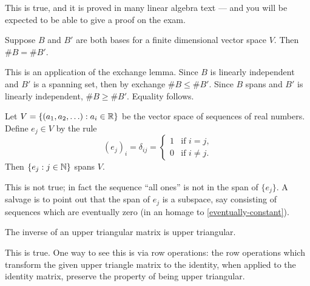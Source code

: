 \documentclass{homework}
\begin{document}
\begin{solution}
  This is true, and it is proved in many linear algebra text --- and
  you will be expected to be able to give a proof on the exam.
\end{solution}

\begin{problem}
  Suppose $B$ and $B'$ are both bases for a finite dimensional vector
  space $V$.  Then $\# B = \# B'$.
\end{problem}

\begin{solution}
  This is an application of the exchange lemma.  Since $B$ is linearly independent and $B'$ is a spanning set, then by exchange $\# B \leq \# B'$.  Since $B$ spans and $B'$ is linearly independent, $\# B \geq \# B'$.  Equality follows.
\end{solution}

\begin{problem}
  Let $V = \{ (a_1,a_2,\ldots) : a_i \in \mathbb{R} \}$ be the vector space of
  sequences of real numbers.  Define $e_j \in V$ by the rule
  \[
    (e_j)_i = \delta_{ij} = \begin{cases}
      1 & \mbox{if $i = j$,} \\
      0 & \mbox{if $i \neq j$.}
    \end{cases}
  \]
  Then $\{ e_j : j \in \mathbb{N} \}$ spans $V$.
\end{problem}

\begin{solution}
  This is not true; in fact the sequence ``all ones'' is not in the
  span of $\{ e_j \}$.  A salvage is to point out that the span of
  $e_j$ is a subspace, say consisting of sequences which are
  eventually zero (in an homage to \ref{eventually-constant}).
\end{solution}

\begin{problem}
  The inverse of an upper triangular matrix is upper triangular.
\end{problem}

\begin{solution}
  This is true.  One way to see this is via row operations: the row
  operations which transform the given upper triangle matrix to the
  identity, when applied to the identity matrix, preserve the property
  of being upper triangular.
\end{solution}
\end{document}
